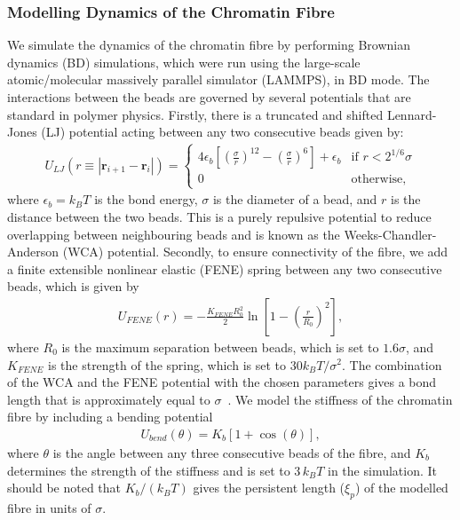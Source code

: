 \documentclass[12pt]{article}
\begin{document}
\subsubsection{Modelling Dynamics of the Chromatin Fibre}
We simulate the dynamics of the chromatin fibre by performing Brownian dynamics (BD) simulations, which were run using the large-scale atomic/molecular massively parallel simulator (LAMMPS), in BD mode. The interactions between the beads are governed by several potentials that are standard in polymer physics. Firstly, there is a truncated and shifted Lennard-Jones (LJ) potential acting between any two consecutive beads given by:
\begin{eqnarray}
U_{LJ}(r \equiv |\bm{r}_{i+1} - \bm{r}_i|) = \left\{ 
	\begin{array}{ll}
		4\epsilon_b \left[\left(\frac{\sigma}{r}\right)^{12} - \left(\frac{\sigma}{r}\right)^6\right] + \epsilon_b & \textrm{if $r < 2^{1/6}\sigma$}\\
		0 & \textrm{otherwise},
	\end{array}
\right.
\end{eqnarray}
where $\epsilon_b = k_BT$ is the bond energy, $\sigma$ is the diameter of a bead, and $r$ is the distance between the two beads. This is a purely repulsive potential to reduce overlapping between neighbouring beads and is known as the Weeks-Chandler-Anderson (WCA) potential. Secondly, to ensure connectivity of the fibre, we add a finite extensible nonlinear elastic (FENE) spring between any two consecutive beads, which is given by
\begin{eqnarray}
U_{FENE}(r) = - \frac{K_{FENE}R_0^2}{2}\ln\left[1-\left(\frac{r}{R_0}\right)^2\right],
\end{eqnarray}
where $R_0$ is the maximum separation between beads, which is set to $1.6\sigma$, and $K_{FENE}$ is the strength of the spring, which is set to $30k_BT/\sigma^2$. The combination of the WCA and the FENE potential with the chosen parameters gives a bond length that is approximately equal to $ \sigma$~\cite{brackley2013}. We model the stiffness of the chromatin fibre by including a bending potential~\cite{kremer1990}
\begin{eqnarray}
U_{bend}(\theta) = K_b \left[1 + \cos(\theta)\right],
\end{eqnarray}
where $\theta$ is the angle between any three consecutive beads of the fibre, and $K_b$ determines the strength of the stiffness and is set to $3\,k_BT$ in the simulation. It should be noted that $K_b/(k_BT)$ gives the persistent length ($\xi_p$) of the modelled fibre in units of $\sigma$. 
\end{document}
